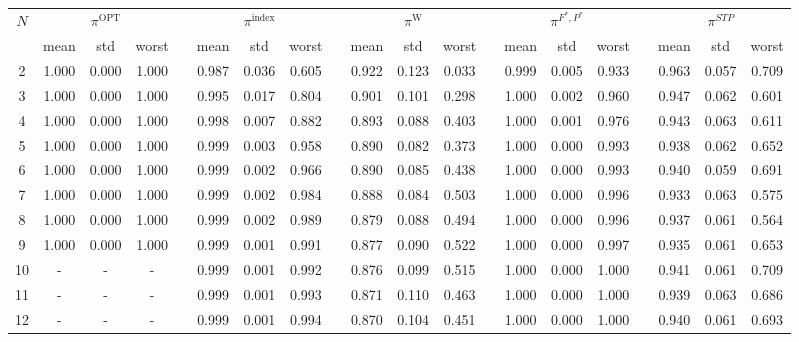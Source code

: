 \documentclass[11pt]{article}
\begin{document}
\begin{table}[H]
\scriptsize
\centering
\begin{adjustbox}{max width=\textwidth}
\begin{tabular}{cccccccccccccccccccc}
\toprule
\multirow{2}[2]{*}{$N$} & \multicolumn{3}{c}{$\pi^\textrm{OPT}$} & & \multicolumn{3}{c}{$\pi^{\textrm{index}}$} & & \multicolumn{3}{c}{$\pi^{\textrm{W}}$} & & \multicolumn{3}{c}{$\pi^{F^*,P^*}$} & & \multicolumn{3}{c}{$\pi^{STP}$} \\
\cmidrule{2-4}\cmidrule{6-8}\cmidrule{10-12}\cmidrule{14-16}\cmidrule{18-20}
  & mean & std & worst & & mean & std & worst & & mean & std & worst & & mean & std & worst & & mean & std & worst \\
\midrule
2  & 1.000 & 0.000 & 1.000 & & 0.987 & 0.036 & 0.605 & & 0.922 & 0.123 & 0.033 & & 0.999 & 0.005 & 0.933 & & 0.963 & 0.057 & 0.709 \\
3  & 1.000 & 0.000 & 1.000 & & 0.995 & 0.017 & 0.804 & & 0.901 & 0.101 & 0.298 & & 1.000 & 0.002 & 0.960 & & 0.947 & 0.062 & 0.601 \\
4  & 1.000 & 0.000 & 1.000 & & 0.998 & 0.007 & 0.882 & & 0.893 & 0.088 & 0.403 & & 1.000 & 0.001 & 0.976 & & 0.943 & 0.063 & 0.611 \\
5  & 1.000 & 0.000 & 1.000 & & 0.999 & 0.003 & 0.958 & & 0.890 & 0.082 & 0.373 & & 1.000 & 0.000 & 0.993 & & 0.938 & 0.062 & 0.652 \\
6  & 1.000 & 0.000 & 1.000 & & 0.999 & 0.002 & 0.966 & & 0.890 & 0.085 & 0.438 & & 1.000 & 0.000 & 0.993 & & 0.940 & 0.059 & 0.691 \\
7  & 1.000 & 0.000 & 1.000 & & 0.999 & 0.002 & 0.984 & & 0.888 & 0.084 & 0.503 & & 1.000 & 0.000 & 0.996 & & 0.933 & 0.063 & 0.575 \\
8  & 1.000 & 0.000 & 1.000 & & 0.999 & 0.002 & 0.989 & & 0.879 & 0.088 & 0.494 & & 1.000 & 0.000 & 0.996 & & 0.937 & 0.061 & 0.564 \\
9  & 1.000 & 0.000 & 1.000 & & 0.999 & 0.001 & 0.991 & & 0.877 & 0.090 & 0.522 & & 1.000 & 0.000 & 0.997 & & 0.935 & 0.061 & 0.653 \\
\cmidrule{1-1}
10 & - & - & - & & 0.999 & 0.001 & 0.992 & & 0.876 & 0.099 & 0.515 & & 1.000 & 0.000 & 1.000 & & 0.941 & 0.061 & 0.709 \\
11 & - & - & - & & 0.999 & 0.001 & 0.993 & & 0.871 & 0.110 & 0.463 & & 1.000 & 0.000 & 1.000 & & 0.939 & 0.063 & 0.686 \\
12 & - & - & - & & 0.999 & 0.001 & 0.994 & & 0.870 & 0.104 & 0.451 & & 1.000 & 0.000 & 1.000 & & 0.940 & 0.061 & 0.693 \\

\end{tabular}
\end{adjustbox}
\end{table}
\end{document}
